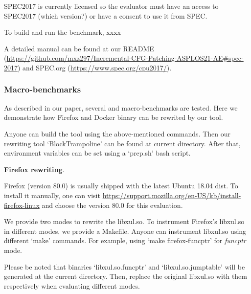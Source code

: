 \documentclass{sigplanconf}
\begin{document}
{SPEC2017 is currently licensed so the evaluator must have an access to SPEC2017 (which version?)
or have a consent to use it from SPEC.

To build and run the benchmark, xxxx

A detailed manual can be found 
at our README (\url{https://github.com/mxz297/Incremental-CFG-Patching-ASPLOS21-AE#spec-2017}) and SPEC.org (\url{https://www.spec.org/cpu2017/}).



\subsubsection{Macro-benchmarks}

As described in our paper, several and macro-benchmarks are tested. 
Here we demonstrate how Firefox and Docker binary can be rewrited by our tool.

Anyone can build the tool using the above-mentioned commands.
Then our rewriting tool `BlockTrampoline' can be found at current directory.
After that, environment variables can be set using a `prep.sh' bash script.


\vspace{2pt}\noindent\textbf{Firefox rewriting}. 

Firefox (version 80.0) is usually shipped with the latest Ubuntu 18.04 dist. 
To install it manually, one can visit \url{https://support.mozilla.org/en-US/kb/install-firefox-linux} and choose the version 80.0 for this evaluation.

We provide two modes to rewrite the libxul.so.
To instrument Firefox’s libxul.so in different modes, we provide a Makefile.
Anyone can instrument libxul.so using different `make' commands. 
For example, using `make firefox-funcptr' for \textit{funcptr} mode. 



Please be noted that binaries `libxul.so.funcptr' and `libxul.so.jumptable' will be generated at the current directory. 
Then, replace the original libxul.so with them respectively when evaluating different modes.


}
\end{document}
